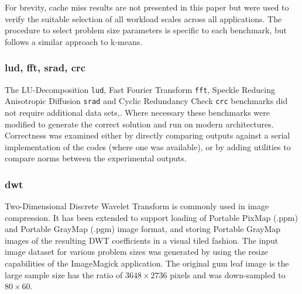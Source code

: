 \documentclass[../document.tex]{subfiles}
\begin{document}
For brevity, cache miss results are not presented in this paper but were used to verify the suitable selection of all workload scales across all applications.
The procedure to select problem size parameters is specific to each benchmark, but follows a similar approach to k-means.

\subsubsection{lud, fft, srad, crc}
The LU-Decomposition {\tt lud}, Fast Fourier Transform {\tt fft}, Speckle Reducing Anisotropic Diffusion {\tt srad} and Cyclic Redundancy Check {\tt crc} benchmarks did not require additional data sets,.
Where necessary these benchmarks were modified to generate the correct solution and run on modern architectures.
Correctness was examined either by directly comparing outputs against a serial implementation of the codes (where one was available), or by adding utilities to compare norms between the experimental outputs.

\subsubsection{dwt}
Two-Dimensional Discrete Wavelet Transform is commonly used in image compression.
It has been extended to support loading of Portable PixMap (.ppm) and Portable GrayMap (.pgm) image format, and storing Portable GrayMap images of the resulting DWT coefficients in a visual tiled fashion.
The input image dataset for various problem sizes was generated by using the resize capabilities of the ImageMagick application.
The original gum leaf image is the large sample size has the ratio of $3648 \times 2736$ pixels and was down-sampled to  $80 \times 60$.
\end{document}
